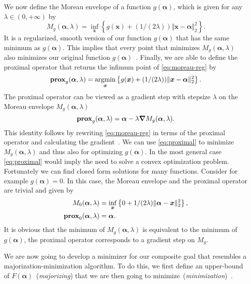 We now define the Moreau envelope of a function \(g (\bm{\alpha})\), which is given for any \(\lambda \in (0, +\infty)\) by
\begin{equation}
  \label{eq:moreau-reg}
  M_{g}(\bm{\alpha}, \lambda) = \inf_{\bm{x}} \left\{  g(\bm{x}) + (1/(2\lambda)) \Vert \bm{x} - \bm{\alpha} \Vert_2^2 \right\}.
\end{equation}
It is a regularized, smooth version of our function \(g(\bm{\alpha})\) that has the
same minimum as \(g(\bm{\alpha})\).
This implies that every point that minimizes \(M_{g}(\bm{\alpha}, \lambda)\) also
minimizes our original function \(g (\bm{\alpha})\)~\cite{proxsurvey}.
Finally, we are able to define the proximal operator that returns the infimum
point of \cref{eq:moreau-reg} by
\begin{equation}
  \label{eq:proximal}
  \prox[\(g\)]{\bm{\alpha}}{\lambda}= \argmin_{\bm{x}} \left\{ g (\bm{x}) + (1/ (2 \lambda)) \Vert \bm{x} - \bm{\alpha} \Vert_2^2 \right\}.
\end{equation}
The proximal operator can be viewed as a gradient step with stepsize \(\lambda\) on the Moreau envelope
\(M_g(\bm{\alpha}, \lambda)\)
\begin{equation*}
  \prox[\(g\)]{\bm{\alpha}}{\lambda} = \bm{\alpha} - \lambda \bm{\nabla} M_{g}(\bm{\alpha}, \lambda).
\end{equation*}
This identity follows by rewriting \cref{eq:moreau-reg} in terms of the proximal operator and calculating the gradient~\cite{proxsurvey}.
We can use \cref{eq:proximal} to minimize \(M_g(\bm{\alpha}, \lambda)\) and
thus also for optimizing \(g(\bm{\alpha})\).
In the most general case \cref{eq:proximal} would imply the need to solve a convex optimization problem.
Fortunately we can find closed form solutions for many functions.
Consider for example \(g(\bm{\alpha}) = 0\).
In this case, the Moreau envelope and the proximal operator are trivial and
given by
\begin{align*}
 M_{0}(\bm{\alpha}, \lambda) &= \inf_{\bm{x}} \left\{ 0 + 1/(2 \lambda) \Vert \bm{\alpha} - \bm{x} \Vert_2^2 \right\}, \\
 \prox[\(0\)]{\bm{\alpha}}{\lambda} &= \bm{\alpha}.
\end{align*}
It is obvious that the minimum of \(M_g(\bm{\alpha}, \lambda)\) is equivalent to the minimum of \(g(\bm{\alpha})\), the proximal operator corresponds to a gradient step on \(M_g\).

We are now going to develop a minimizer for our composite goal that resembles a majorization-minimization algorithm.
To do this, we first define an upper-bound of \(F(\bm{\alpha})\)~(\emph{majorizing}) that we are then going to minimize~(\emph{minimization})~\autocite{proxsurvey}.

